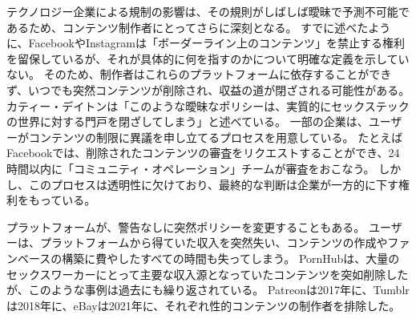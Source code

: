 \documentclass[paper=a4,book,openany]{jlreq}
\begin{document}
テクノロジー企業による規制の影響は、その規則がしばしば曖昧で予測不可能であるため、コンテンツ制作者にとってさらに深刻となる。
すでに述べたように、FacebookやInstagramは「ボーダーライン上のコンテンツ」を禁止する権利を留保しているが、それが具体的に何を指すのかについて明確な定義を示していない。
そのため、制作者はこれらのプラットフォームに依存することができず、いつでも突然コンテンツが削除され、収益の道が閉ざされる可能性がある。
カティー・デイトンは「このような曖昧なポリシーは、実質的にセックステックの世界に対する門戸を閉ざしてしまう」と述べている\citep{deighton20:_why_sex_start_face_uphil_paymen_battl}。
一部の企業は、ユーザーがコンテンツの制限に異議を申し立てるプロセスを用意している。
たとえばFacebookでは、削除されたコンテンツの審査をリクエストすることができ、24時間以内に「コミュニティ・オペレーション」チームが審査をおこなう。
しかし、このプロセスは透明性に欠けており、最終的な判断は企業が一方的に下す権利をもっている。

プラットフォームが、警告なしに突然ポリシーを変更することもある。
ユーザーは、プラットフォームから得ていた収入を突然失い、コンテンツの作成やファンベースの構築に費やしたすべての時間も失ってしまう。
PornHubは、大量のセックスワーカーにとって主要な収入源となっていたコンテンツを突如削除したが、このような事例は過去にも繰り返されている。
Patreonは2017年に、Tumblrは2018年に、eBayは2021年に、それぞれ性的コンテンツの制作者を排除した\citep{cooper17:_real_conseq_patreon_adult_conten_crack}。
\end{document}
